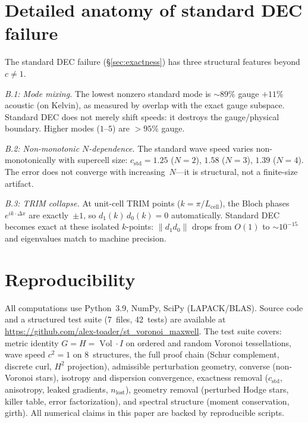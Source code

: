 \documentclass[preprint,12pt]{elsarticle}
\DeclareMathOperator{\Vol}{Vol}
\begin{document}
\section{Detailed anatomy of standard DEC failure}
\label{app:std_anatomy}

The standard DEC failure (\S\ref{sec:exactness}) has three structural
features beyond $c \neq 1$.

\emph{B.1: Mode mixing.}
The lowest nonzero standard mode is $\sim 89\%$ gauge $+ 11\%$ acoustic
(on Kelvin), as measured by overlap with the exact gauge subspace. Standard
DEC does not merely shift speeds: it destroys the gauge/physical boundary.
Higher modes ($1$--$5$) are $> 95\%$ gauge.

\emph{B.2: Non-monotonic $N$-dependence.}
The standard wave speed varies non-monotonically with supercell size:
$c_{\mathrm{std}} = 1.25$ ($N\!=\!2$), $1.58$ ($N\!=\!3$), $1.39$
($N\!=\!4$). The error does not converge with increasing~$N$---it is
structural, not a finite-size artifact.

\emph{B.3: TRIM collapse.}
At unit-cell TRIM points ($k = \pi/L_{\mathrm{cell}}$), the Bloch phases
$e^{ik \cdot \Delta x}$ are exactly~$\pm 1$, so
$d_1(k)\, d_0(k) = 0$ automatically. Standard DEC becomes exact at these
isolated $k$-points: $\|d_1 d_0\|$ drops from $O(1)$ to $\sim 10^{-15}$
and eigenvalues match to machine precision.


\section*{Reproducibility}

All computations use Python~3.9, NumPy, SciPy (LAPACK/BLAS). Source code
and a structured test suite (7~files, 42~tests) are available at
\url{https://github.com/alex-toader/st_voronoi_maxwell}. The test suite
covers: metric identity $G = H = \Vol \cdot I$ on ordered and random
Voronoi tessellations, wave speed $c^2 = 1$ on 8~structures, the full
proof chain (Schur complement, discrete curl, $H^2$ projection),
admissible perturbation geometry, converse (non-Voronoi stars),
isotropy and dispersion convergence, exactness removal ($c_{\mathrm{std}}$,
anisotropy, leaked gradients, $n_{\mathrm{lost}}$), geometry removal
(perturbed Hodge stars, killer table, error factorization), and spectral
structure (moment conservation, girth). All numerical claims in this
paper are backed by reproducible scripts.
\end{document}
